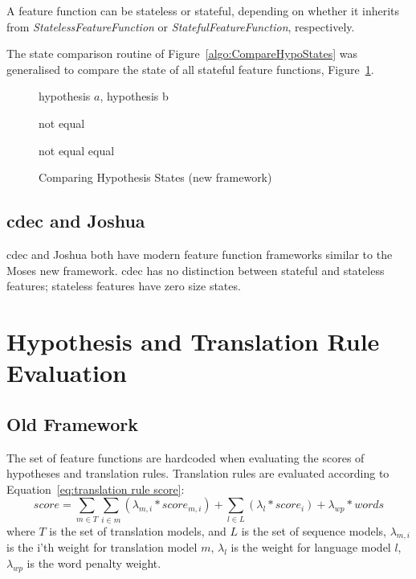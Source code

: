 \documentclass{pbml}
\begin{document}
A feature function can be stateless or stateful, depending on whether it inherits from \emph{StatelessFeatureFunction} or \emph{StatefulFeatureFunction}, respectively.

The state comparison routine of Figure~\ref{algo:CompareHypoStates} was generalised to compare the state of all stateful feature functions, Figure~\ref{algo:CompareHypoStates.new}.

\begin{figure} [h!]
\small 
\begin{algorithmic}
\REQUIRE hypothesis $a$, hypothesis b

	\RETURN not equal
       \ENDIF
       
	    \RETURN not equal
	 \ENDIF
        \ENDFOR
        \RETURN equal

\end{algorithmic}
\caption{Comparing Hypothesis States (new framework)}
\label{algo:CompareHypoStates.new}
\end{figure} 
        
\subsection{cdec and Joshua}
cdec and Joshua both have modern feature function frameworks similar to the Moses new framework. cdec has no distinction between stateful and stateless features; stateless features have zero size states.

\section{Hypothesis and Translation Rule Evaluation}
\subsection{Old Framework}
The set of feature functions are hardcoded when evaluating the scores of hypotheses and translation rules. Translation rules are evaluated according to Equation~\ref{eq:translation rule score}:
\begin{equation}
  score = \sum_{m \in T} \sum_{i \in m} (\lambda_{m,i} * score_{m,i}) + \sum_{l  \in L} (\lambda_l * score_i) + \lambda_{wp} * words
\label{eq:translation rule score}
\end{equation}
where $T$ is the set of translation models, and $L$ is the set of sequence models, $\lambda_{m,i}$ is the i'th weight for translation model $m$, $\lambda_l$ is the weight for language model $l$, $\lambda_{wp}$ is the word penalty weight.
\end{document}
